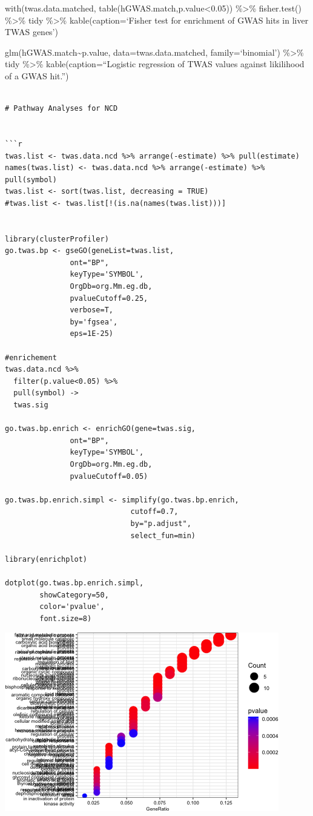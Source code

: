 \documentclass[
]{article}
\begin{document}
with(twas.data.matched, table(hGWAS.match,p.value\textless0.05))
\%\textgreater\% fisher.test() \%\textgreater\% tidy \%\textgreater\%
kable(caption=`Fisher test for enrichment of GWAS hits in liver TWAS
genes')

glm(hGWAS.match\textasciitilde p.value, data=twas.data.matched,
family=`binomial') \%\textgreater\% tidy \%\textgreater\%
kable(caption=``Logistic regression of TWAS values against likilihood of
a GWAS hit.'')

\begin{verbatim}

# Pathway Analyses for NCD


```r
twas.list <- twas.data.ncd %>% arrange(-estimate) %>% pull(estimate)
names(twas.list) <- twas.data.ncd %>% arrange(-estimate) %>% pull(symbol)
twas.list <- sort(twas.list, decreasing = TRUE)
#twas.list <- twas.list[!(is.na(names(twas.list)))]


library(clusterProfiler)
go.twas.bp <- gseGO(geneList=twas.list, 
               ont="BP", 
               keyType='SYMBOL',
               OrgDb=org.Mm.eg.db, 
               pvalueCutoff=0.25,
               verbose=T,
               by='fgsea',
               eps=1E-25)

#enrichement
twas.data.ncd %>% 
  filter(p.value<0.05) %>%
  pull(symbol) ->
  twas.sig

go.twas.bp.enrich <- enrichGO(gene=twas.sig, 
               ont="BP", 
               keyType='SYMBOL',
               OrgDb=org.Mm.eg.db, 
               pvalueCutoff=0.05)

go.twas.bp.enrich.simpl <- simplify(go.twas.bp.enrich,
                             cutoff=0.7, 
                             by="p.adjust",
                             select_fun=min)

library(enrichplot)

dotplot(go.twas.bp.enrich.simpl, 
        showCategory=50,
        color='pvalue',
        font.size=8)
\end{verbatim}

\includegraphics{figures/twas-go-ncd-1.png}
\end{document}
